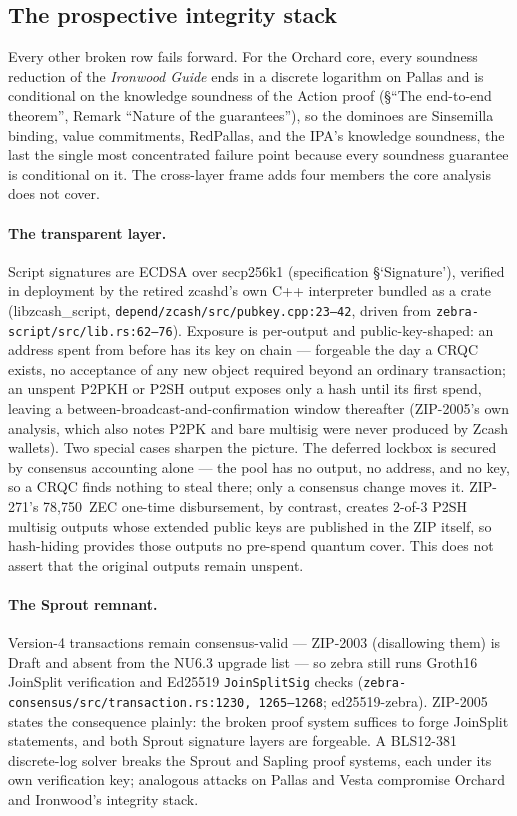 \documentclass[11pt,a4paper]{article}
\theoremstyle{definition}
\begin{document}
\subsection{The prospective integrity stack}\label{sec:pq-prosp}

Every other broken row fails forward. For the Orchard core, every
soundness reduction of the \emph{Ironwood Guide} ends in a discrete
logarithm on Pallas and is conditional on the knowledge soundness of the
Action proof (\S``The end-to-end theorem'', Remark ``Nature of the
guarantees''), so the dominoes are Sinsemilla binding, value commitments,
RedPallas, and the IPA's knowledge soundness, the last the single most
concentrated failure point because every soundness guarantee is
conditional on it. The
cross-layer frame adds four members the core analysis does not cover.

\paragraph{The transparent layer.} Script signatures are ECDSA over
secp256k1 (specification \S`Signature'), verified in deployment by the
retired \textsf{zcashd}'s own C++ interpreter bundled as a crate
(\textsf{libzcash\_script},
\texttt{depend/\allowbreak zcash/\allowbreak src/\allowbreak pubkey.cpp:23--42},
driven from \texttt{zebra-script/\allowbreak src/\allowbreak lib.rs:62--76}).
Exposure is
per-output and public-key-shaped: an address spent from before has its
key on chain --- forgeable the day a CRQC exists, no acceptance of any
new object required beyond an ordinary transaction; an unspent P2PKH or
P2SH output exposes only a hash until its first spend, leaving a
between-broadcast-and-confirmation window thereafter (ZIP-2005's own
analysis, which also notes P2PK and bare multisig were never produced
by Zcash wallets). Two special cases sharpen the picture. The deferred
lockbox is secured by consensus accounting alone --- the pool has no
output, no address, and no key, so a CRQC finds nothing to steal there;
only a consensus change moves it. ZIP-271's 78{,}750~ZEC one-time
disbursement, by contrast, creates 2-of-3 P2SH multisig outputs whose
extended public keys are published in the ZIP itself, so hash-hiding
provides those outputs no pre-spend quantum cover. This does not assert
that the original outputs remain unspent.

\paragraph{The Sprout remnant.} Version-4 transactions remain
consensus-valid --- ZIP-2003 (disallowing them) is Draft and absent
from the NU6.3 upgrade list --- so \textsf{zebra} still runs Groth16
JoinSplit verification and Ed25519 \texttt{JoinSplitSig} checks
(\texttt{zebra-consensus/src/transaction.rs:1230, 1265--1268};
\textsf{ed25519-zebra}). ZIP-2005 states the consequence plainly: the
broken proof system suffices to forge JoinSplit statements, and both
Sprout signature layers are forgeable. A BLS12-381 discrete-log solver
breaks the Sprout and Sapling proof systems, each under its own
verification key; analogous attacks on Pallas and Vesta compromise
Orchard and Ironwood's integrity stack.
\end{document}
